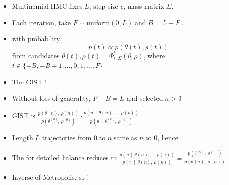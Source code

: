\documentclass[10pt]{report}
\newcommand{\pos}[2]{#1^{(#2)}}
\begin{document}
\begin{itemize}
\item Multinomial HMC fixes  $L$, step size
  $\epsilon$, mass matrix $\Sigma$.
\item Each iteration, take $F \sim \textrm{uniform}(0, L)$  and $B = L - F$ .
  \item {} with probability
    $$p(t) \propto p(\theta(t), \rho(t))$$ from
    candidates  $\theta(t), \rho(t) = \Phi^t_{\epsilon,
      \Sigma}(\theta, \rho)$, where $t \in \{ -B, -B + 1, \ldots, 0, 1, \ldots, F \}$
\item The GIST !
\end{itemize}

\begin{itemize}
\item Without loss of generality,  $F + B = L$ and selected $n > 0$
\item GIST  is
  $\frac{p(\theta(n),\,   \rho(n))}
        {p(\pos{\theta}{0},\, \pos{\rho}{0})}
   \cdot
   \frac{p(n \, \mid \, \theta(n),\, -\rho(n))}
        {p(n \, \mid \, \pos{\theta}{0},\, \pos{\rho}{0})}$
      \item Length $L$ trajectories from 0 to $n$ same
        as $n$ to 0, hence
\item The  for detailed balance reduces to
$\frac{p(n \, \mid \, \theta(n),\, -\rho(n))}
      {p(n \, \mid \, \theta(n),\, \rho(n))}
      = \frac{p(\pos{\theta}{0},\, \pos{\rho}{0})}
      {p(\theta(n),\, \rho(n))}$
\item Inverse of Metropolis, so !
\end{itemize}
\end{document}
